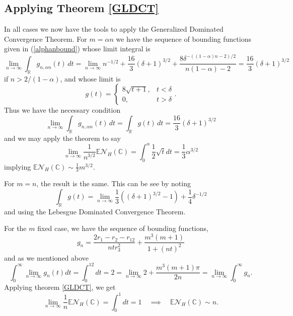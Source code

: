 \documentclass[12pt]{amsart}
\theoremstyle{remark}
\begin{document}
\subsection{Applying Theorem \ref{GLDCT}}
In all cases we now have the tools to apply the Generalized Dominated Convergence Theorem.  For $m=\alpha n$ we have the sequence of bounding functions given in (\ref{alphanbound})
whose limit integral is
\begin{equation}
\lim_{n\rightarrow\infty}\int_\mathbb{R}g_{n,\alpha n}(t)\,dt=\lim_{n\rightarrow\infty}n^{-1/2}+{\textstyle\frac{16}{3}}(\delta+1)^{3/2}+\frac{8\delta^{-((1-\alpha)n-2)/2}}{n(1-\alpha)-2}={\textstyle\frac{16}{3}}(\delta+1)^{3/2}
\end{equation}if $n>2/(1-\alpha)$,
and whose limit is
\begin{equation}
g(t)=\left\{\begin{array}{ll}8\sqrt{t+1},&t<\delta\\0,&t>\delta\end{array}\right.
.\end{equation}
Thus we have the necessary condition
\begin{equation}
\lim_{n\rightarrow\infty}\int_\mathbb{R}g_{n,\alpha n}(t)\,dt=\int_\mathbb{R}g(t)\,dt=\frac{16}{3}(\delta+1)^{3/2}
\end{equation}
and we may apply the theorem to say
\begin{equation}
\lim_{n\rightarrow\infty}\frac{1}{n^{3/2}}\mathbb{E}\mathcal{N}_H(\mathbb{C})=\int_0^\alpha\frac{1}{2}\sqrt{t}dt=\frac{1}{3}\alpha^{3/2}
\end{equation}
implying $\mathbb{E}\mathcal{N}_H(\mathbb{C})\sim \frac{1}{3}m^{3/2}$.

For $m=n$, the result is the same.  This can be see by noting
\[\int_\mathbb{R}g(t)=\lim_{n\rightarrow\infty}\frac{1}{3}((\delta+1)^{3/2}-1)+\frac{1}{4}\delta^{-1/2}\] and using the Lebesgue Dominated Convergence Theorem.

For the $m$ fixed case, we have the sequence of bounding functions,
\begin{equation}
g_n=\frac{2r_1-r_2-r_{12}}{ntr_3^2}+\frac{m^3(m+1)}{1+(nt)^2}
\end{equation}
and as we mentioned above
\begin{equation}
\int_0^\infty\lim_{n\rightarrow\infty}g_n(t)dt=\int_0^12dt=2=\lim_{n\rightarrow\infty}2+\frac{m^3(m+1)\pi}{2n}=\lim_{n\rightarrow\infty}\int_0^\infty g_n.
\end{equation}
Applying theorem \ref{GLDCT}, we get
\begin{equation}
\lim_{n\rightarrow\infty}\frac{1}{n}\mathbb{E}\mathcal{N}_H(\mathbb{C})=\int_0^1dt=1\quad\implies \quad\mathbb{E}\mathcal{N}_H(\mathbb{C})\sim n.
\end{equation}
\end{document}
